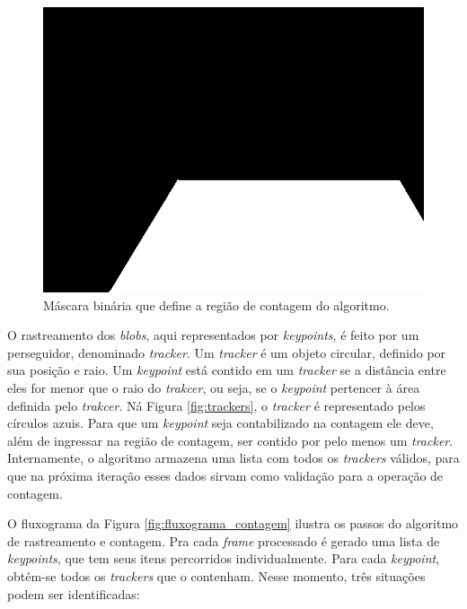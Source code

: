 \begin{figure}[ht]
  \begin{center}
    \includegraphics[scale=0.5]{imgs/bin_mask.png}
  \end{center}
  \caption{Máscara binária que define a região de contagem do algoritmo.}
  \label{fig:bin_mask}
\end{figure}

O rastreamento dos \textit{blobs}, aqui representados por \textit{keypoints}, é feito por um perseguidor, denominado \textit{tracker}. Um \textit{tracker} é um objeto circular, definido por sua posição e raio. Um \textit{keypoint} está contido em um \textit{tracker} se a distância entre eles for menor que o raio do \textit{trakcer}, ou seja, se o \textit{keypoint} pertencer à área definida pelo \textit{trakcer}. Ná Figura \ref{fig:trackers}, o \textit{tracker} é representado pelos círculos azuis. Para que um \textit{keypoint} seja contabilizado na contagem ele deve, além de ingressar na região de contagem, ser contido por pelo menos um \textit{tracker}. Internamente, o algoritmo armazena uma lista com todos os \textit{trackers} válidos, para que na próxima iteração esses dados sirvam como validação para a operação de contagem.

O fluxograma da Figura \ref{fig:fluxograma_contagem} ilustra os passos do algoritmo de rastreamento e contagem. Pra cada \textit{frame} processado é gerado uma lista de \textit{keypoints}, que tem seus itens percorridos individualmente. Para cada \textit{keypoint}, obtém-se todos os \textit{trackers} que o contenham. Nesse momento, três situações podem ser identificadas:

